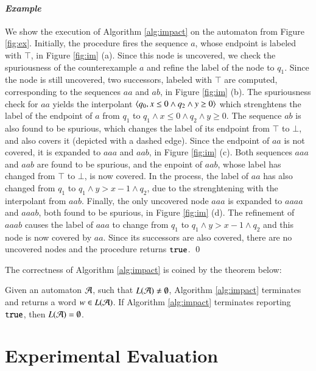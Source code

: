 \documentclass[10pt]{llncs}
\begin{document}
\paragraph{\em Example}
We show the execution of Algorithm \ref{alg:impact} on the automaton
from Figure \ref{fig:ex}.  Initially, the procedure fires the sequence
$a$, whose endpoint is labeled with $\top$, in Figure \ref{fig:im}
(a). Since this node is uncovered, we check the spuriousness of the
counterexample $a$ and refine the label of the node to $q_1$. Since
the node is still uncovered, two successors, labeled with $\top$ are
computed, corresponding to the sequences $aa$ and $ab$, in Figure
\ref{fig:im} (b). The spuriousness check for $aa$ yields the
interpolant $\left\langle q_0,x\leq0\wedge q_2 \wedge y\geq0 \right\rangle$ which
strenghtens the label of the endpoint of $a$ from $q_1$ to $q_1\wedge
x\leq0\wedge q_2\wedge y\geq0$. The sequence $ab$ is also found to be
spurious, which changes the label of its endpoint from $\top$ to
$\bot$, and also covers it (depicted with a dashed edge). Since the
endpoint of $aa$ is not covered, it is expanded to $aaa$ and $aab$, in
Figure \ref{fig:im} (c). Both sequences $aaa$ and $aab$ are found to
be spurious, and the enpoint of $aab$, whose label has changed from
$\top$ to $\bot$, is now covered. In the process, the label of $aa$
has also changed from $q_1$ to $q_1 \wedge y>x-1 \wedge q_2$, due to
the strenghtening with the interpolant from $aab$.  Finally, the only
uncovered node $aaa$ is expanded to $aaaa$ and $aaab$, both found to be
spurious, in Figure \ref{fig:im} (d). The refinement of $aaab$ causes
the label of $aaa$ to change from $q_1$ to $q_1 \wedge y>x-1 \wedge
q_2$ and this node is now covered by $aa$. Since its successors are
also covered, there are no uncovered nodes and the procedure returns
$\mathtt{true}$. \qed

The correctness of Algorithm \ref{alg:impact} is coined by the theorem
below:

\begin{theorem}\label{thm:impact}
  Given an automaton $\mathcal{A}$, such that $L(\mathcal{A}) \neq \emptyset$, Algorithm
  \ref{alg:impact} terminates and returns a word $w \in L(\mathcal{A})$. If
  Algorithm \ref{alg:impact} terminates reporting $\mathtt{true}$, then
  $L(\mathcal{A}) = \emptyset$.
\end{theorem}

\section{Experimental Evaluation}
\end{document}
